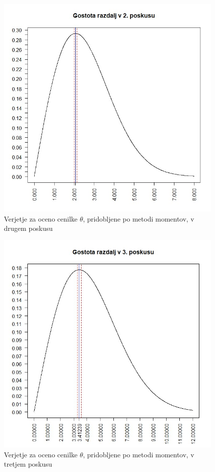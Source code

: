\documentclass[a4paper, 10pt]{article}
\begin{document}
	\begin{figure}[h!]
		\label{fig: 2Eplot2}
		\centering
		\includegraphics[scale = 0.35]{VerjetjeMM2}
		\caption{Verjetje za oceno cenilke $\theta$, pridobljene po metodi momentov, v drugem poskusu}
	\end{figure}
	
	\begin{figure}[h!]
		\label{fig: 2Eplot3}
		\centering
		\includegraphics[scale = 0.35]{VerjetjeMM3}
		\caption{Verjetje za oceno cenilke $\theta$, pridobljene po metodi momentov, v tretjem poskusu}
	\end{figure}
	
\end{document}
